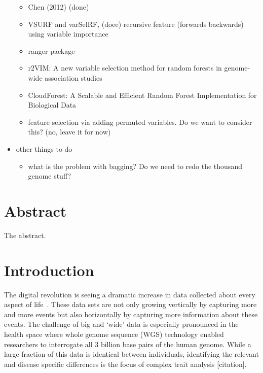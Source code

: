 \documentclass[10pt,a4paper]{article}  %
\begin{document}
\begin{itemize}
\begin{itemize}
  \item Chen (2012)  (done)
  \item VSURF and  varSelRF, (doee) recursive feature (forwards backwards) using variable importance
  \item ranger package
  \item  r2VIM: A new variable selection method for random forests in
    genome-wide association studies
  \item CloudForest: A Scalable and Efficient Random Forest Implementation for Biological Data
  \item \cite{Tuv.et.al.2009} feature selection via adding permuted variables. Do we want to consider this? (no, leave it for now)
  \end{itemize}
\item other things to do
  \begin{itemize}
  \item what is the problem with bagging? Do we need to redo the thousand genome stuff?
  \end{itemize}
\end{itemize}


\clearpage

\section{Abstract}
The abstract.

\linenumbers

\section{Introduction}

The digital revolution is seeing a dramatic increase in data collected about every aspect of 
life~\cite{Loebbecke2015}.  These data sets are not only growing vertically by capturing more and more events but also
horizontally by capturing more information about these events.  The challenge of big and `wide' data is especially
pronounced in the health space where whole genome sequence (WGS) technology enabled researchers to interrogate all 3
billion base pairs of the human genome.  While a large fraction of this data is identical between individuals,
identifying the relevant and disease specific differences is the focus of complex trait analysis [citation].
\end{document}
